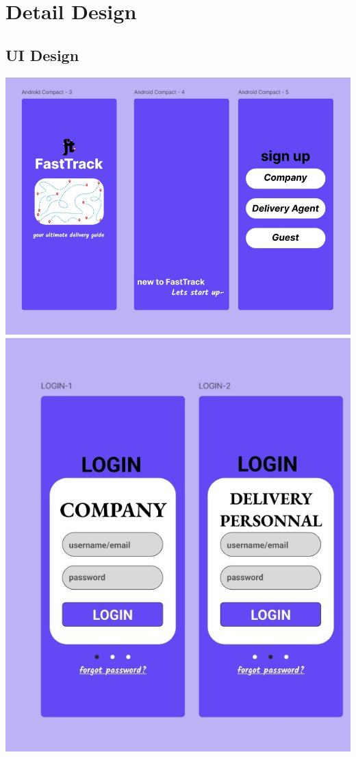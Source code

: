 \documentclass{article}
\begin{document}
\section{Detail Design}
\subsection{UI Design}
\vspace{3cm}
\includegraphics[scale=0.75]{signup.jpg}
\newpage
\vspace*{5cm}
\hspace*{3cm}
\includegraphics[scale=0.75]{Login.jpg}
\end{document}
